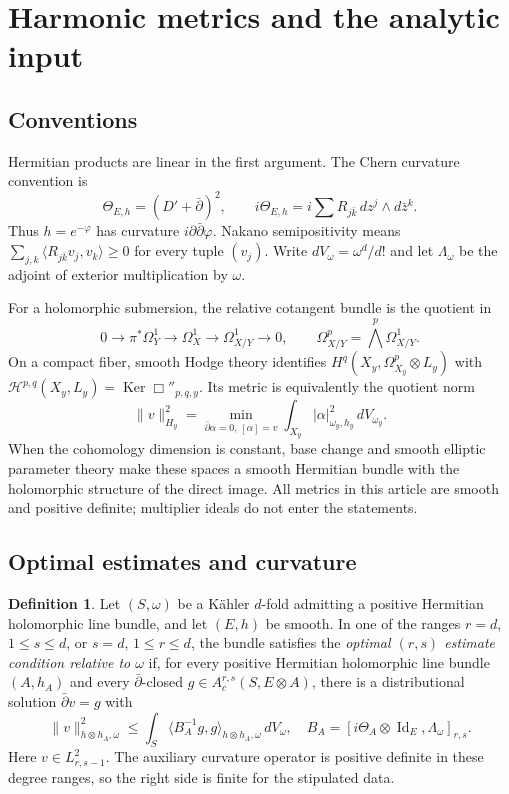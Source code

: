 \documentclass[11pt,reqno]{amsart}
\numberwithin{equation}{section}
\theoremstyle{definition}
\newtheorem{definition}[theorem]{Definition}
\theoremstyle{remark}
\newcommand{\ddbar}{\partial\bar\partial}
\newcommand{\db}{\bar\partial}
\newcommand{\cH}{\mathcal H}
\newcommand{\Id}{\operatorname{Id}}
\newcommand{\Ker}{\operatorname{Ker}}
\newcommand{\ip}[2]{\langle #1,#2\rangle}
\begin{document}
\section{Harmonic metrics and the analytic input}\label{sec:analytic}

\subsection{Conventions}
Hermitian products are linear in the first argument. The Chern curvature convention is
\[
 \Theta_{E,h}=(D'+\db)^2,\qquad
 i\Theta_{E,h}=i\sum R_{j\bar k}\,dz^j\wedge d\bar z^k.
\]
Thus $h=e^{-\varphi}$ has curvature $i\ddbar\varphi$. Nakano semipositivity means
$\sum_{j,k}\ip{R_{j\bar k}v_j}{v_k}\geq0$ for every tuple $(v_j)$.
Write $dV_\omega=\omega^d/d!$ and let $\Lambda_\omega$ be the adjoint of exterior multiplication by $\omega$.

For a holomorphic submersion, the relative cotangent bundle is the quotient in
\[
 0\longrightarrow\pi^*\Omega_Y^1\longrightarrow\Omega_X^1
   \longrightarrow\Omega_{X/Y}^1\longrightarrow0,
 \qquad \Omega^p_{X/Y}=\bigwedge^p\Omega^1_{X/Y}.
\]
On a compact fiber, smooth Hodge theory identifies
$H^q(X_y,\Omega^p_{X_y}\otimes L_y)$ with
$\cH^{p,q}(X_y,L_y)=\Ker\Box''_{p,q,y}$. Its metric is equivalently the quotient norm
\begin{equation}\label{eq:minimum}
 \|v\|_{H_y}^2
 =\min_{\db\alpha=0,\,[\alpha]=v}
       \int_{X_y}|\alpha|_{\omega_y,h_y}^2\,dV_{\omega_y}.
\end{equation}
When the cohomology dimension is constant, base change and smooth elliptic parameter theory make these spaces a smooth Hermitian bundle with the holomorphic structure of the direct image. All metrics in this article are smooth and positive definite; multiplier ideals do not enter the statements.

\subsection{Optimal estimates and curvature}
\begin{definition}\label{def:optimal}
Let $(S,\omega)$ be a K\"ahler $d$-fold admitting a positive Hermitian holomorphic line bundle, and let $(E,h)$ be smooth. In one of the ranges
$r=d$, $1\leq s\leq d$, or $s=d$, $1\leq r\leq d$, the bundle satisfies the \emph{optimal $(r,s)$ estimate condition relative to $\omega$} if, for every positive Hermitian holomorphic line bundle $(A,h_A)$ and every $\db$-closed $g\in A_c^{r,s}(S,E\otimes A)$, there is a distributional solution $\db v=g$ with
\begin{equation}\label{eq:optimal-definition}
 \|v\|_{h\otimes h_A,\omega}^2
 \leq\int_S\ip{B_A^{-1}g}{g}_{h\otimes h_A,\omega}\,dV_\omega,
 \quad B_A=[i\Theta_A\otimes\Id_E,\Lambda_\omega]_{r,s}.
\end{equation}
Here $v\in L^2_{r,s-1}$. The auxiliary curvature operator is positive definite in these degree ranges, so the right side is finite for the stipulated data.
\end{definition}
\end{document}

